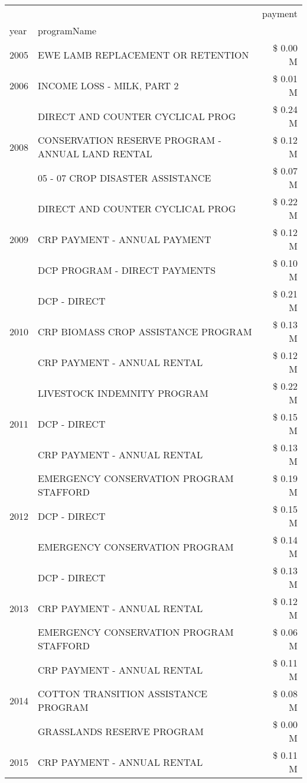 \begin{tabular}{llr}
\toprule
 &  & payment \\
year & programName &  \\
\midrule
2005 & EWE LAMB REPLACEMENT OR RETENTION & \$ 0.00 M \\
\cline{1-3}
2006 & INCOME LOSS - MILK, PART 2 & \$ 0.01 M \\
\cline{1-3}
\multirow[t]{3}{*}{2008} & DIRECT AND COUNTER CYCLICAL PROG & \$ 0.24 M \\
 & CONSERVATION RESERVE PROGRAM - ANNUAL LAND RENTAL & \$ 0.12 M \\
 & 05 - 07 CROP DISASTER ASSISTANCE & \$ 0.07 M \\
\cline{1-3}
\multirow[t]{3}{*}{2009} & DIRECT AND COUNTER CYCLICAL PROG & \$ 0.22 M \\
 & CRP PAYMENT - ANNUAL PAYMENT & \$ 0.12 M \\
 & DCP PROGRAM - DIRECT PAYMENTS & \$ 0.10 M \\
\cline{1-3}
\multirow[t]{3}{*}{2010} & DCP - DIRECT & \$ 0.21 M \\
 & CRP BIOMASS CROP ASSISTANCE PROGRAM & \$ 0.13 M \\
 & CRP PAYMENT - ANNUAL RENTAL & \$ 0.12 M \\
\cline{1-3}
\multirow[t]{3}{*}{2011} & LIVESTOCK INDEMNITY PROGRAM & \$ 0.22 M \\
 & DCP - DIRECT & \$ 0.15 M \\
 & CRP PAYMENT - ANNUAL RENTAL & \$ 0.13 M \\
\cline{1-3}
\multirow[t]{3}{*}{2012} & EMERGENCY CONSERVATION PROGRAM STAFFORD & \$ 0.19 M \\
 & DCP - DIRECT & \$ 0.15 M \\
 & EMERGENCY CONSERVATION PROGRAM & \$ 0.14 M \\
\cline{1-3}
\multirow[t]{3}{*}{2013} & DCP - DIRECT & \$ 0.13 M \\
 & CRP PAYMENT - ANNUAL RENTAL & \$ 0.12 M \\
 & EMERGENCY CONSERVATION PROGRAM STAFFORD & \$ 0.06 M \\
\cline{1-3}
\multirow[t]{3}{*}{2014} & CRP PAYMENT - ANNUAL RENTAL & \$ 0.11 M \\
 & COTTON TRANSITION ASSISTANCE PROGRAM & \$ 0.08 M \\
 & GRASSLANDS RESERVE PROGRAM & \$ 0.00 M \\
\cline{1-3}
\multirow[t]{3}{*}{2015} & CRP PAYMENT - ANNUAL RENTAL & \$ 0.11 M \\

\end{tabular}

